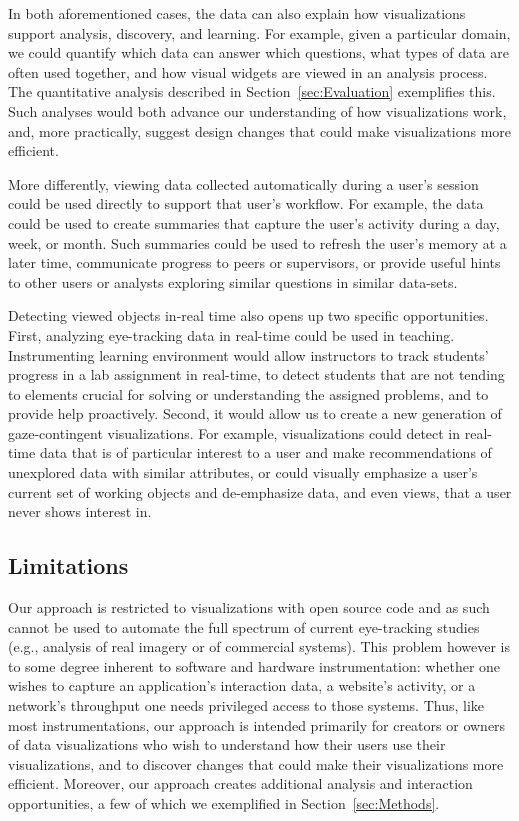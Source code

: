 In both aforementioned cases, the data can also explain how visualizations support analysis, discovery, and learning. For example, given a particular domain, we could quantify which data can answer which questions, what types of data are often used together, and how visual widgets are viewed in an analysis process.  The quantitative analysis described in Section~\ref{sec:Evaluation} exemplifies this. Such analyses would both advance our understanding of how visualizations work, and, more practically, suggest design changes that could make visualizations more efficient. 

More differently, viewing data collected automatically during a user's session could be used directly to support that user's workflow. For example, the data could be used to create summaries that capture the user's activity during a day, week, or month. Such summaries could be used to refresh the user's memory at a later time, communicate progress to peers or supervisors, or provide useful hints to other users or analysts exploring similar questions in similar data-sets.

Detecting viewed objects in-real time also opens up two specific opportunities. First, analyzing eye-tracking data in real-time could be used in teaching. Instrumenting learning environment would allow instructors to track students' progress in a lab assignment in real-time, to detect students that are not tending to elements crucial for solving or understanding the assigned problems, and to provide help proactively. Second, it would allow us to create a new generation of gaze-contingent visualizations. For example, visualizations could detect in real-time data that is of particular interest to a user and make recommendations of unexplored data with similar attributes, or could visually emphasize a user's current set of working objects and de-emphasize data, and even views, that a user never shows interest in. 

\subsection{Limitations}
\label{sec:Limitations}
Our approach is restricted to visualizations with open source code and as such cannot be used to automate the full spectrum of current eye-tracking studies (e.g., analysis of real imagery or of commercial systems).   This problem however is to some degree inherent to software and hardware instrumentation: whether one wishes to capture an application's interaction data, a website's activity, or a network's throughput one needs privileged access to those systems. Thus, like most instrumentations, our approach is intended primarily for creators or owners of data visualizations who wish to understand how their users use their visualizations, and to discover changes that could make their visualizations more efficient. Moreover, our approach creates additional analysis and interaction opportunities, a few of which we exemplified in Section~\ref{sec:Methods}. 

